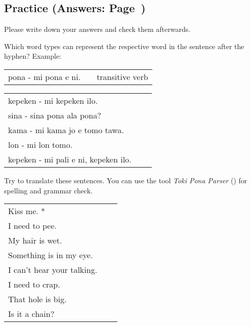 %
\newpage
%
\subsection*{Practice (Answers: Page~\pageref{'the_body'})}
%

Please write down your answers and check them afterwards.

Which word types can represent the respective word in the sentence after the hyphen?
Example:

\begin{supertabular}{p{5,5cm}|ll}
    pona - mi pona e ni. &  & transitive verb \\ %
\end{supertabular}

\begin{supertabular}{p{5,5cm}|ll}
    kepeken - mi kepeken ilo.            &  & \\ %
    sina - sina pona ala pona?           &  & \\ %
    kama - mi kama jo e tomo tawa.       &  & \\ %
    lon - mi lon tomo.                   &  & \\ %
    kepeken - mi pali e ni, kepeken ilo. &  & \\ %
\end{supertabular}

Try to translate these sentences.
You can use the tool \textit{Toki Pona Parser} (\cite{www:rowa:02}) for spelling and grammar check.

\begin{supertabular}{p{5,5cm}|ll}
    Kiss me. *                 &  & \\ %
    I need to pee.             &  & \\ %
    My hair is wet.            &  & \\ %
    Something is in my eye.    &  & \\ %
    I can't hear your talking. &  & \\ %
    I need to crap.            &  & \\ %
    That hole is big.          &  & \\ %
    Is it a chain?             &  & \\ %
\end{supertabular}

